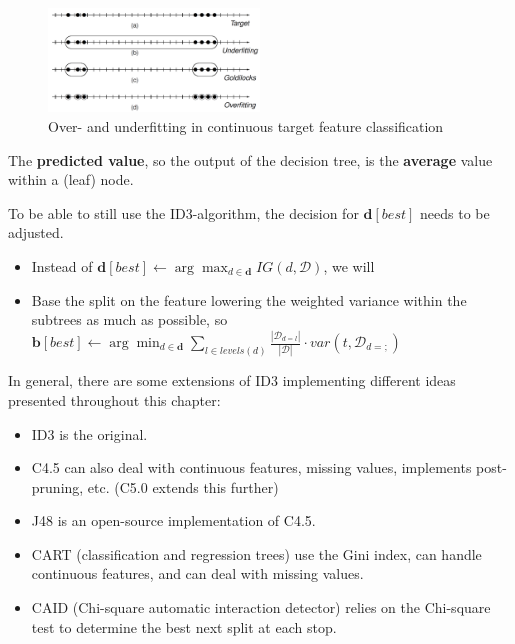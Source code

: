 \begin{figure}[h]
  \centering
  \includegraphics[width=0.5\textwidth]{assets/trees/cont/target_overunder.png}
  \caption{Over- and underfitting in continuous target feature classification}
  \label{fig:3_overunder_target}
\end{figure}

The \textbf{predicted value}, so the output of the decision tree, is the \textbf{average} value within a (leaf) node.


To be able to still use the ID3-algorithm, the decision for $\mathbf{d}[best]$ needs to be adjusted.
\begin{itemize}
  \item Instead of $\mathbf{d}[best] \leftarrow \arg\max_{d\in\mathbf{d}} IG(d, \mathcal{D})$, we will
  \item Base the split on the feature lowering the weighted variance within the subtrees as much as possible, so $\mathbf{b}[best] \leftarrow \arg\min_{d\in\mathbf{d}}\sum_{l\in levels(d)}\frac{|\mathcal{D}_{d=l}|}{|\mathcal{D}|}\cdot var(t, \mathcal{D}_{d=;})$
\end{itemize}
In general, there are some extensions of ID3 implementing different ideas presented throughout this chapter:
\begin{itemize}
  \item ID3 is the original.
  \item C4.5 can also deal with continuous features, missing values, implements post-pruning, etc. (C5.0 extends this further)
  \item J48 is an open-source implementation of C4.5.
  \item CART (classification and regression trees) use the Gini index, can handle continuous features, and can deal with missing values.
  \item CAID (Chi-square automatic interaction detector) relies on the Chi-square test to determine the best next split at each stop.
\end{itemize}


